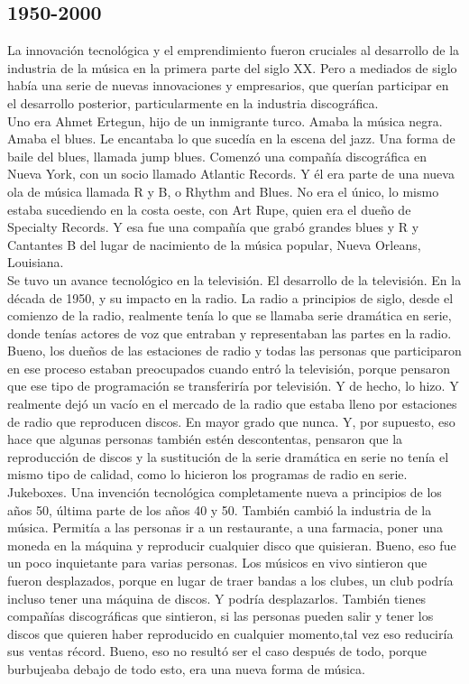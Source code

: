 \documentclass[10pt]{book}
\begin{document}
\subsection{1950-2000}
La innovación tecnológica y el emprendimiento fueron cruciales al desarrollo de la industria de la música en la primera parte del siglo XX. Pero a mediados de siglo había una serie de nuevas innovaciones y empresarios, que querían participar en el desarrollo posterior, particularmente en la industria discográfica. \\
Uno era Ahmet Ertegun, hijo de un inmigrante turco. Amaba la música negra. Amaba el blues. Le encantaba lo que sucedía en la escena del jazz. Una forma de baile del blues, llamada jump blues. Comenzó una compañía discográfica en Nueva York, con un socio llamado Atlantic Records. Y él era parte de una nueva ola de música llamada R y B, o Rhythm and Blues. No era el único, lo mismo estaba sucediendo en la costa oeste, con Art Rupe, quien era el dueño de Specialty Records. Y esa fue una compañía que grabó grandes blues y R y Cantantes B del lugar de nacimiento de la música popular, Nueva Orleans, Louisiana.\\
Se tuvo un avance tecnológico en la televisión. El desarrollo de la televisión. En la década de 1950, y su impacto en la radio. La radio a principios de siglo, desde el comienzo de la radio, realmente tenía lo que se llamaba serie dramática en serie, donde tenías actores de voz que entraban y representaban las partes en la radio. Bueno, los dueños de las estaciones de radio y todas las personas que participaron en ese proceso estaban preocupados cuando entró la televisión, porque pensaron que ese tipo de programación se transferiría por televisión. Y de hecho, lo hizo. Y realmente dejó un vacío en el mercado de la radio que estaba lleno por estaciones de radio que reproducen discos. En mayor grado que nunca. Y, por supuesto, eso hace que algunas personas también estén descontentas, pensaron que la reproducción de discos y la sustitución de la serie dramática en serie no tenía el mismo tipo de calidad, como lo hicieron los programas de radio en serie. \\
Jukeboxes. Una invención tecnológica completamente nueva a principios de los años 50, última parte de los años 40 y 50. También cambió la industria de la música. Permitía a las personas ir a un restaurante, a una farmacia, poner una moneda en la máquina y reproducir cualquier disco que quisieran. Bueno, eso fue un poco inquietante para varias personas. Los músicos en vivo sintieron que fueron desplazados, porque en lugar de traer bandas a los clubes, un club podría incluso tener una máquina de discos. Y podría desplazarlos. También tienes compañías discográficas que sintieron, si las personas pueden salir y tener los discos que quieren haber reproducido en cualquier momento,tal vez eso reduciría sus ventas récord. Bueno, eso no resultó ser el caso después de todo, porque burbujeaba debajo de todo esto, era una nueva forma de música.\\
\end{document}

